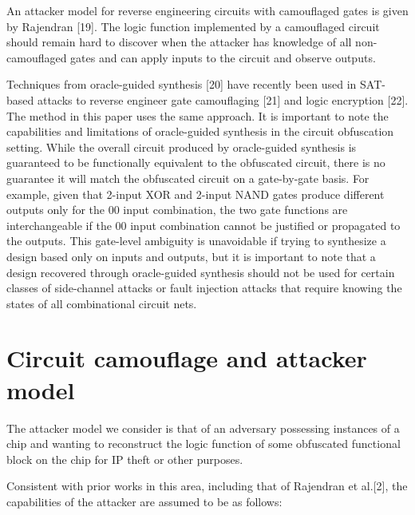 \documentclass[proposal]{umassthesis}  %
\begin{document}
An attacker model for reverse engineering circuits with camouflaged gates is given by Rajendran [19]. The logic function implemented by a camouflaged circuit should remain hard to discover when the attacker has knowledge of all non-camouflaged gates and can apply inputs to the circuit and observe outputs. {Techniques from oracle-guided synthesis [20] have recently been used in SAT-based attacks to reverse engineer gate camouflaging [21] and logic encryption [22]. The method in this paper uses the same approach. It is important to note the capabilities and limitations of oracle-guided synthesis in the circuit obfuscation setting. While the overall circuit produced by oracle-guided synthesis is guaranteed to be functionally equivalent to the obfuscated circuit, there is no guarantee it will match the obfuscated circuit on a gate-by-gate basis. For example, given that 2-input XOR and 2-input NAND gates produce different outputs only for the 00 input combination, the two gate functions are interchangeable if the 00 input combination cannot be justified or propagated to the outputs. This gate-level ambiguity is unavoidable if trying to synthesize a design based only on inputs and outputs, but it is important to note that a design recovered through oracle-guided synthesis should not be used for certain classes of side-channel attacks or fault injection attacks that require knowing the states of all combinational circuit nets. %























\chapter{Circuit camouflage and attacker model}

The attacker model we consider is that of an adversary possessing instances of a chip and wanting to reconstruct the logic function of some obfuscated functional block on the chip for IP theft or other purposes.} Consistent with prior works in this area, including that of Rajendran et al.[2], the capabilities of the attacker are assumed to be as follows: 
\end{document}
